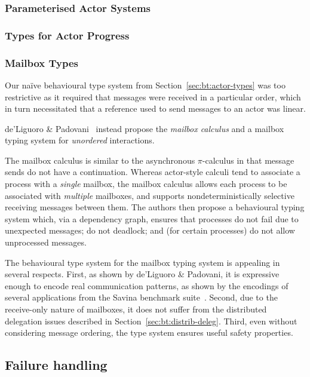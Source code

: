 \documentclass[
graybox,
envcountchap
]{svmult}
\begin{document}
\begin{bibunit}
  \subsubsection{Parameterised Actor Systems}

  \subsubsection{Types for Actor Progress}


  \subsubsection{Mailbox Types}
  Our na\"ive behavioural type system from Section~\ref{sec:bt:actor-types} was too
  restrictive as it required that messages were received in a particular order,
  which in turn necessitated that a reference used to send messages to an actor
  was linear.

  de'Liguoro \& Padovani~\cite{deLiguoroP18:mailbox} instead propose the \emph{mailbox calculus}
  and a mailbox typing system for \emph{unordered} interactions.

  The mailbox calculus is similar to the asynchronous $\pi$-calculus in that
  message sends do not have a continuation. Whereas actor-style calculi tend to
  associate a process with a \emph{single} mailbox, the mailbox calculus allows
  each process to be associated with \emph{multiple} mailboxes, and supports
  nondeterministically selective receiving messages between them.
  The authors then propose a behavioural typing system which, via a
  dependency graph, ensures that processes do not fail due to unexpected
  messages; do not deadlock; and (for certain processes) do not allow
  unprocessed messages.

  The behavioural type system for the mailbox typing system is appealing in
  several respects. First, as shown by de'Liguoro \& Padovani, it is expressive
  enough to encode real communication patterns, as shown by the encodings of
  several applications from the Savina benchmark suite~\cite{ImamS14:savina}. Second, due
  to the receive-only nature of mailboxes, it does not suffer from the
  distributed delegation issues described in Section~\ref{sec:bt:distrib-deleg}.
  Third, even without considering message ordering, the type system ensures
  useful safety properties.

  \subsection{Failure handling}\label{sec:bt:failure-handling}


\end{bibunit}
\end{document}
